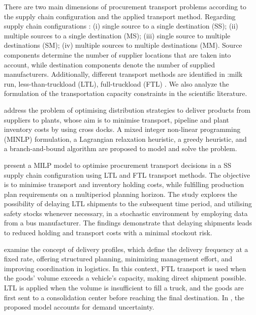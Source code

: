 There are two main dimensions of procurement transport problems according to the supply chain configuration and the applied transport method. Regarding supply chain configurations \autocite{Mosca2019IntegratedReview}: (i) single source to a single destination (SS); (ii) multiple sources to a single destination (MS);
(iii) single source to multiple destinations (SM); (iv) multiple sources to multiple destinations (MM). Source components determine the number of supplier locations that are taken into account, while destination components denote the number of supplied manufacturers. Additionally, different transport methods are identified in \autocite{Diaz-Madronero2014AChain}:milk run, less-than-truckload (LTL),  full-truckload (FTL) . We also analyze the formulation of the transportation capacity constraints in the scientific literature.

\autocite{Berman2006InboundCost} address the problem of optimising distribution strategies to deliver products from suppliers to plants, whose aim is to minimise transport, pipeline and plant inventory costs by using cross docks. A mixed integer non-linear programming (MINLP) formulation, a Lagrangian  relaxation heuristic,  a greedy heuristic, and a branch-and-bound algorithm are proposed to model and solve the problem.

\autocite{Sancak2011Multi-itemPolicy} present a MILP model to optimise procurement transport decisions in a SS supply chain configuration using LTL and FTL transport methods. The objective is to minimise transport and inventory holding costs, while fulfilling production plan requirements on a multiperiod planning horizon. The study explores the possibility of delaying LTL shipments to the subsequent time period, and utilising safety stocks whenever necessary, in a stochastic environment by employing data from a bus manufacturer. The findings demonstrate that delaying shipments leads to reduced holding and transport costs with a minimal stockout risk.


\autocite{Schoneberg2010AnNetworks} examine the concept of delivery profiles, which define the delivery frequency at a fixed rate, offering structured planning, minimizing management effort, and improving coordination in logistics. In this context, FTL transport is used when the goods' volume exceeds a vehicle's capacity, making direct shipment possible. LTL is applied when the volume is insufficient to fill a truck, and the goods are first sent to a consolidation center before reaching the final destination. In \autocite{Schoneberg2013ANetworks}, the proposed model accounts for demand uncertainty.

